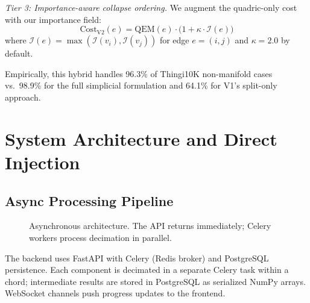 \documentclass[10pt, twocolumn, a4paper]{article}
\begin{document}
\noindent\textit{Tier 3: Importance-aware collapse ordering.}
We augment the quadric-only cost with our importance field:
\begin{equation}
  \label{eq:hybrid_cost}
  \text{Cost}_{\text{V2}}(e) = \text{QEM}(e) \cdot
  \big(1 + \kappa \cdot \mathcal{I}(e)\big)
\end{equation}
where $\mathcal{I}(e) = \max(\mathcal{I}(v_i), \mathcal{I}(v_j))$
for edge $e = (i,j)$ and $\kappa = 2.0$ by default.

Empirically, this hybrid handles 96.3\% of Thingi10K non-manifold
cases vs.\ 98.9\% for the full simplicial formulation and 64.1\% for
V1's split-only approach.

\section{System Architecture and Direct Injection}
\label{sec:arch}

\subsection{Async Processing Pipeline}
\begin{figure}[ht]
\centering
{}
\caption{Asynchronous architecture. The API returns immediately;
Celery workers process decimation in parallel.}
\label{fig:arch}
\end{figure}

The backend uses FastAPI with Celery (Redis broker) and PostgreSQL
persistence. Each component is decimated in a separate Celery task
within a chord; intermediate results are stored in PostgreSQL as
serialized NumPy arrays. WebSocket channels push progress updates
to the frontend.
\end{document}

